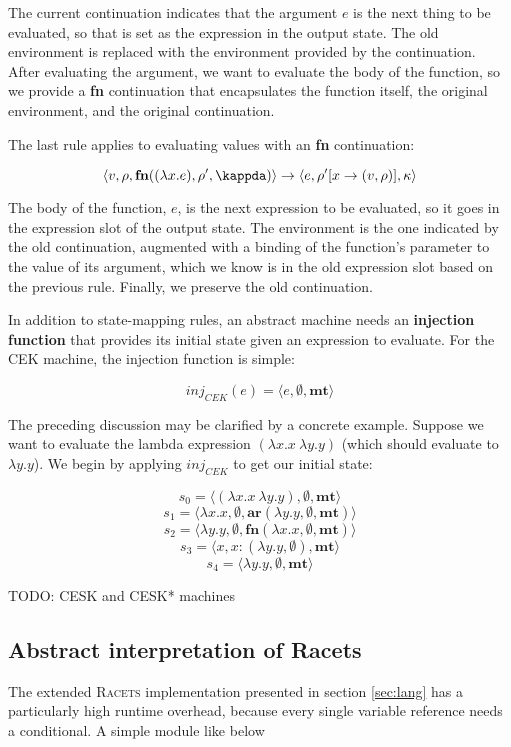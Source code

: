 \documentclass{article}
\begin{document}
The current continuation indicates that the argument $e$ is the next thing to be evaluated, so that is set as the expression in the output state. The old environment is replaced with the environment provided by the continuation. After evaluating the argument, we want to evaluate the body of the function, so we provide a \textbf{fn} continuation that encapsulates the function itself, the original environment, and the original continuation.

The last rule applies to evaluating values with an \textbf{fn} continuation:

$$ \langle v, \rho, \textbf{fn}((\lambda x.e), \rho', \kappda) \rangle \to \langle e, \rho'[x \to (v, \rho)], \kappa \rangle $$

The body of the function, $e$, is the next expression to be evaluated, so it goes in the expression slot of the output state. The environment is the one indicated by the old continuation, augmented with a binding of the function's parameter to the value of its argument, which we know is in the old expression slot based on the previous rule. Finally, we preserve the old continuation.

In addition to state-mapping rules, an abstract machine needs an \textbf{injection function} that provides its initial state given an expression to evaluate. For the CEK machine, the injection function is simple:

$$ inj_{CEK}(e) = \langle e, \emptyset, \textbf{mt} \rangle $$

The preceding discussion may be clarified by a concrete example. Suppose we want to evaluate the lambda expression $(\lambda x.x\ \lambda y.y)$ (which should evaluate to $\lambda y.y$). We begin by applying $inj_{CEK}$ to get our initial state:

$$ s_0 = \langle (\lambda x.x\ \lambda y.y), \emptyset, \textbf{mt} \rangle $$
$$ s_1 = \langle \lambda x.x, \emptyset, \textbf{ar}(\lambda y.y, \emptyset, \textbf{mt}) \rangle $$
$$ s_2 = \langle \lambda y.y, \emptyset, \textbf{fn}(\lambda x.x, \emptyset, \textbf{mt}) \rangle $$
$$ s_3 = \langle x, {x: (\lambda y.y, \emptyset)}, \textbf{mt} \rangle $$
$$ s_4 = \langle \lambda y.y, \emptyset, \textbf{mt} \rangle $$

TODO: CESK and CESK* machines


\subsection{Abstract interpretation of Racets}
The extended \textsc{Racets} implementation presented in section \ref{sec:lang} has a particularly high runtime overhead, because every single variable reference needs a conditional. A simple module like below
\end{document}
